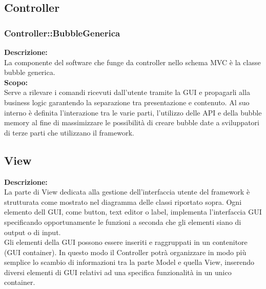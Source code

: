 \subsection{Controller}
\begin{samepage}
\subsubsection{Controller::BubbleGenerica}\label{fm-generica}
\end{samepage}
\textbf{Descrizione:}\\
La componente del software che funge da controller nello schema MVC è la classe bubble generica.\\
\textbf{Scopo:}\\
Serve a rilevare i comandi ricevuti dall'utente tramite la GUI e propagarli alla business logic garantendo la separazione tra presentazione e contenuto. Al suo interno è definita l'interazione tra le varie parti, l'utilizzo delle API e della bubble memory al fine di massimizzare le possibilità di creare bubble date a sviluppatori di terze parti che utilizzano il framework.

\begin{samepage}
\subsection{View}
\end{samepage}
\textbf{Descrizione:}\\
La parte di View dedicata alla gestione dell'interfaccia utente del framework è strutturata come mostrato nel diagramma delle classi riportato sopra.
Ogni elemento dell GUI, come button, text editor o label, implementa l'interfaccia GUI specificando opportunamente le funzioni a seconda che gli elementi siano di output o di input.\\
Gli elementi della GUI possono essere inseriti e raggruppati in un contenitore (GUI container). In questo modo il Controller potrà organizzare in modo più semplice lo scambio di informazioni tra la parte Model e quella View, inserendo diversi elementi di GUI relativi ad una specifica funzionalità in un unico container.

